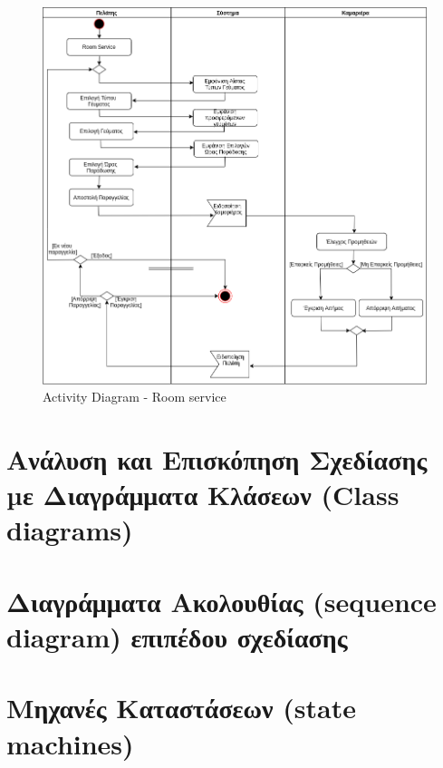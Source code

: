 \begin{figure}[H]
	\centering
	\includegraphics[width=1\textwidth]{Images/Activity-Room service}
		\caption{Activity Diagram - Room service}
		\label{Activity - Room service}
\end{figure}
\clearpage

\section{Ανάλυση και Επισκόπηση Σχεδίασης µε Διαγράμματα Κλάσεων (Class diagrams)}
\section{Διαγράμματα Ακολουθίας (sequence diagram) επιπέδου σχεδίασης}
\section{Μηχανές Καταστάσεων (state machines)}

